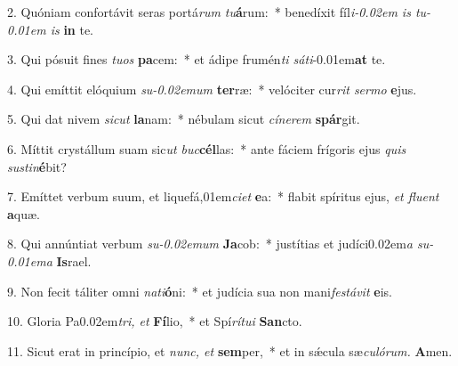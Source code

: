 \item 2. Quóniam confortávit seras portá\textit{rum tu}\textbf{á}rum:~* benedíxit fíl\textit{i\kern -0.02em is tu\kern -0.01em is} \textbf{in} te.

\item 3. Qui pósuit fines \textit{tuos} \textbf{pa}cem:~* et ádipe frumén\textit{ti sáti}\kern -0.01em\textbf{at} te.

\item 4. Qui emíttit elóquium \textit{su\kern -0.02emum} \textbf{ter}ræ:~* velóciter cur\textit{rit sermo} \textbf{e}jus.

\item 5. Qui dat nivem \textit{sicut} \textbf{la}nam:~* nébulam sicut \textit{cínerem} \textbf{spár}git.

\item 6. Míttit crystállum suam sic\textit{ut buc}\textbf{cél}las:~* ante fáciem frígoris ejus \textit{quis sus\-tin}\textbf{é}bit?

\item 7. Emíttet verbum suum, et liquefá,01em\textit{ciet} \textbf{e}a:~* flabit spíritus ejus, \textit{et fluent} \textbf{a}quæ.

\item 8. Qui annúntiat verbum \textit{su\kern-0.02emum} \textbf{Ja}cob:~* justítias et judíci\kern 0.02em\textit{a su\kern -0.01ema} \textbf{Is}rael.

\item 9. Non fecit táliter omni \textit{nati}\textbf{ó}ni:~* et judícia sua non mani\textit{festávit} \textbf{e}is.

\item 10. Gloria Pa\kern 0.02em\textit{tri, et} \textbf{Fí}lio,~* et Spí\textit{rítui} \textbf{San}cto.

\item 11. Sicut erat in princípio, et \textit{nunc, et} \textbf{sem}per,~* et in sǽcula sæ\hspace{0.03em}\textit{culórum.} \textbf{A}men.
